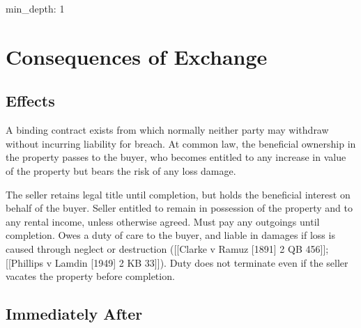 \documentclass[
]{article}
\author{}
\date{}
\newenvironment{Shaded}{}{}
\newcommand{\NormalTok}[1]{#1}
\begin{document}
{
\setcounter{tocdepth}{3}
\tableofcontents
}
\begin{Shaded}
\begin{Highlighting}[]
\NormalTok{min\_depth: 1}
\end{Highlighting}
\end{Shaded}

\hypertarget{consequences-of-exchange}{%
\section{Consequences of Exchange}\label{consequences-of-exchange}}

\hypertarget{effects}{%
\subsection{Effects}\label{effects}}

A binding contract exists from which normally neither party may withdraw
without incurring liability for breach. At common law, the beneficial
ownership in the property passes to the buyer, who becomes entitled to
any increase in value of the property but bears the risk of any loss
damage.

The seller retains legal title until completion, but holds the
beneficial interest on behalf of the buyer. Seller entitled to remain in
possession of the property and to any rental income, unless otherwise
agreed. Must pay any outgoings until completion. Owes a duty of care to
the buyer, and liable in damages if loss is caused through neglect or
destruction ({[}{[}Clarke v Ramuz {[}1891{]} 2 QB 456{]}{]};
{[}{[}Phillips v Lamdin {[}1949{]} 2 KB 33{]}{]}). Duty does not
terminate even if the seller vacates the property before completion.

\hypertarget{immediately-after}{%
\subsection{Immediately After}\label{immediately-after}}
\end{document}
